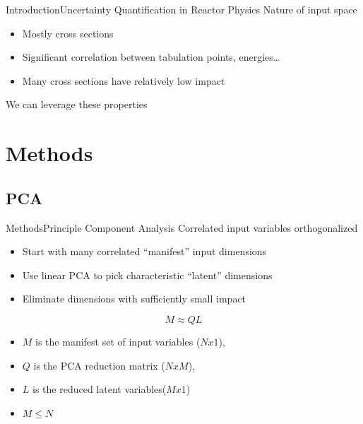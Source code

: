 \documentclass{beamer}
\begin{document}
\begin{frame}{Introduction}{Uncertainty Quantification in Reactor Physics}\vspace{-30pt}
  Nature of input space
  \begin{itemize}
    \item Mostly cross sections
    \item Significant correlation between tabulation points, energies\dots
    \item Many cross sections have relatively low impact
  \end{itemize}
  \vspace{15pt}
  We can leverage these properties
\end{frame}


\section{Methods}
\subsection{PCA}
\begin{frame}{Methods}{Principle Component Analysis}%
  Correlated input variables orthogonalized
  \begin{itemize}
    \item Start with many correlated ``manifest'' input dimensions
    \item Use linear PCA to pick characteristic ``latent'' dimensions
    \item Eliminate dimensions with sufficiently small impact
  \end{itemize}
  \vspace{5pt}
  \begin{equation}
    M \approx Q L \nonumber
  \end{equation}
  \vspace{-5pt}
  \begin{itemize}
    \item $M$ is the manifest set of input variables ($Nx1$),
    \item $Q$ is the PCA reduction matrix ($NxM$),
    \item $L$ is the reduced latent variables($Mx1$)
    \item $M \leq N$
  \end{itemize}
\end{frame}
\end{document}
